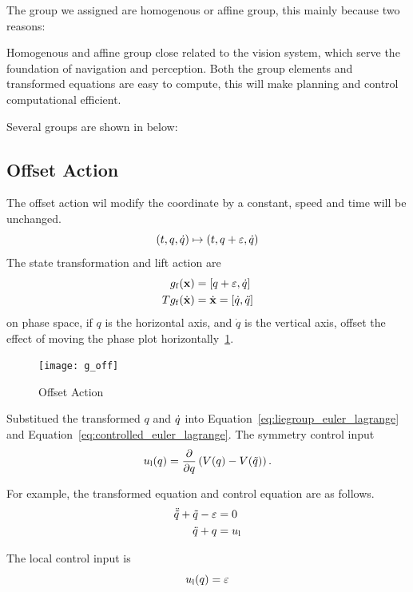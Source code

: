 The group we assigned are homogenous or affine group, this mainly because two reasons:
\begin{itemize}
 Homogenous and affine group close related to the vision system, which serve the foundation of navigation and perception.
 Both the group elements and transformed equations are easy to compute, this will make planning and control  computational efficient.
\end{itemize}

Several groups are shown in below:

\subsection*{ Offset Action}
The offset action wil modify the coordinate by a constant, speed and time will be unchanged.
\[
(t,q,\dot{q}) \mapsto (t,q+\varepsilon,\dot{q})
\]
The state transformation and lift action are
\begin{align}
g_{\mathrm{f}}(\mathbf{x}) &= [q+\varepsilon,\dot{q}] \\
Tg_{\mathrm{f}}(\dot{\mathbf{x}})&=\dot{\mathbf{x}}=[\dot{q},\ddot{q}]
\end{align}
on phase space, if $q$ is the horizontal axis, and $\dot{q}$ is the vertical axis, offset the effect of moving the phase plot horizontally~\ref{fig:goff}.

\begin{figure}[!htbp]
  \begin{center}
      \texttt{[image: g\_off]}
    \caption{Offset Action}
    \label{fig:goff}
\end{center}
\end{figure}

Substitued the transformed $q$ and $\dot{q}$ into Equation~\ref{eq:liegroup_euler_lagrange} and Equation~\ref{eq:controlled_euler_lagrange}.
The symmetry control input
\begin{equation}
u_{\mathrm{l}}(q) = \frac{\partial}{\partial q} \left(V(q)-V(\tilde{q}) \right).
\end{equation}

For example, the transformed equation and control equation are as follows.
\begin{align}
\ddot{\tilde{q}}+\tilde{q}-\varepsilon&=0 \nonumber \\
\ddot{q}+q&=u_{\mathrm{l}} \nonumber
\end{align}

The local control input is
\[
u_{\mathrm{l}}(q)=\varepsilon
\]





